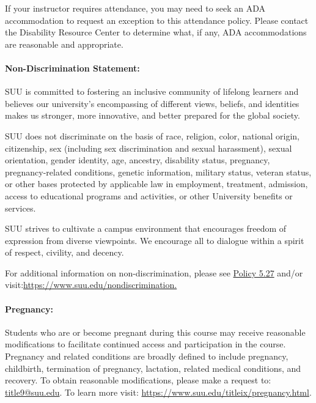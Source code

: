 \documentclass[12pt, letterpaper]{article}
\begin{document}
\noindent
If your instructor requires attendance, you may need to seek an ADA accommodation to request an exception to this attendance policy. Please contact the Disability Resource Center to determine what, if any, ADA accommodations are reasonable and appropriate.

\paragraph{Non-Discrimination Statement:}
SUU is committed to fostering an inclusive community of lifelong learners and believes our university's encompassing of different views, beliefs, and identities makes us stronger, more innovative, and better prepared for the global society. 

\noindent
SUU does not discriminate on the basis of race, religion, color, national origin, citizenship, sex (including sex discrimination and sexual harassment), sexual orientation, gender identity, age, ancestry, disability status, pregnancy, pregnancy-related conditions, genetic information, military status, veteran status, or other bases protected by applicable law in employment, treatment, admission, access to educational programs and activities, or other University benefits or services.

\noindent
SUU strives to cultivate a campus environment that encourages freedom of expression from diverse viewpoints. We encourage all to dialogue within a spirit of respect, civility, and decency. 

\noindent
For additional information on non-discrimination, please see \href{https://www.suu.edu/policies/05/27.html}{Policy 5.27} and/or visit:\newline \href{https://www.suu.edu/nondiscrimination.}{https://www.suu.edu/nondiscrimination.}

\paragraph{Pregnancy:}
Students who are or become pregnant during this course may receive reasonable modifications to facilitate continued access and participation in the course. Pregnancy and related conditions are broadly defined to include pregnancy, childbirth, termination of pregnancy, lactation, related medical conditions, and recovery. To obtain reasonable modifications, please make a request to: \href{mailto:title9@suu.edu}{title9@suu.edu}. To learn more visit: \href{https://www.suu.edu/titleix/pregnancy.html}{https://www.suu.edu/titleix/pregnancy.html}.
\end{document}
